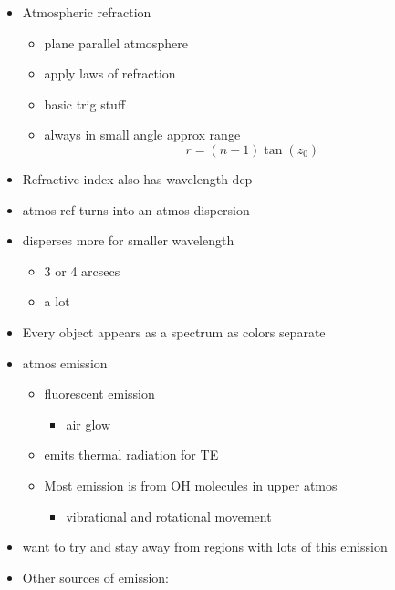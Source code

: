 \documentclass[a4paper,11pt,normalem]{article}
\begin{document}
\begin{itemize}
    \item Atmospheric refraction
        \begin{itemize}
            \item plane parallel atmosphere
            \item apply laws of refraction
            \item basic trig stuff
            \item always in small angle approx range
                \begin{equation*}
                    r = (n - 1)\tan{(z_0)}
                \end{equation*}
        \end{itemize}
    \item Refractive index also has wavelength dep
    \item atmos ref turns into an atmos dispersion
    \item disperses more for smaller wavelength
        \begin{itemize}
            \item 3 or 4 arcsecs
            \item a lot
        \end{itemize}
    \item Every object appears as a spectrum as colors separate
    \item atmos emission
        \begin{itemize}
            \item fluorescent emission
                \begin{itemize}
                    \item air glow
                \end{itemize}
            \item emits thermal radiation for TE
            \item Most emission is from OH molecules in upper atmos
                \begin{itemize}
                    \item vibrational and rotational movement
                \end{itemize}
        \end{itemize}
    \item want to try and stay away from regions with lots of this emission
    \item Other sources of emission:
        \begin{itemize}

\end{itemize}
\end{itemize}
\end{document}
